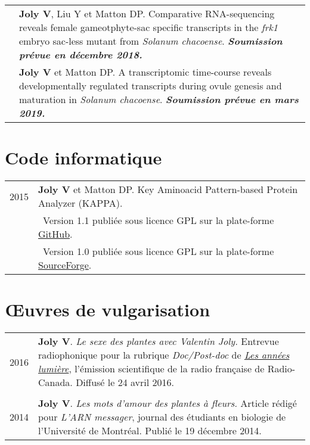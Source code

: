 \documentclass[letterpaper,12pt]{article}
\begin{document}
\begin{tabularx}{\textwidth}{@{}r|X@{}}
& \textbf{Joly V}, Liu Y et Matton DP.
  Comparative RNA-sequencing reveals female gameotphyte-sac specific transcripts in the \emph{frk1} embryo sac-less mutant from \emph{Solanum chacoense}. {\bfseries\em Soumission prévue en décembre 2018.} \vspace{3mm} \\

& \textbf{Joly V} et Matton DP.
  A transcriptomic time-course reveals developmentally regulated transcripts during ovule genesis and maturation in \emph{Solanum chacoense}. {\bfseries\em Soumission prévue en mars 2019.} \\
\end{tabularx}

\vspace{6mm}

\section[Code informatique]{Code informatique}

\begin{tabularx}{\textwidth}{@{}r|X@{}}

2015 & \textbf{Joly V} et Matton DP. Key Aminoacid Pattern-based Protein Analyzer (KAPPA). \\
& \small \hspace{1.5mm} \textbullet{}~Version 1.1 publiée sous licence GPL sur la plate-forme \href{https://github.com/valentinjoly/kappa-1.1}{GitHub}. \\
& \small \hspace{1.5mm} \textbullet{}~Version 1.0 publiée sous licence GPL sur la plate-forme \href{https://sourceforge.net/projects/kappa-sequence-search/}{SourceForge}. \\

\end{tabularx}

\vspace{6mm}

\section[Vulgarisation]{Œuvres de vulgarisation}

\begin{tabularx}{\textwidth}{@{}r|X@{}}

2016 & \textbf{Joly V}. {\em Le sexe des plantes avec Valentin Joly.} Entrevue radiophonique pour la rubrique {\em Doc/Post-doc} de \href{http://ici.radio-canada.ca/emissions/les_annees_lumiere/2015-2016/chronique.asp?idChronique=404672}{\em Les années lumière}, l’émission scientifique de la radio française de Radio-Canada. Diffusé le 24 avril 2016. \\

\multicolumn{2}{c}{} \\

2014 & \textbf{Joly V}. {\em Les mots d’amour des plantes à fleurs}. Article rédigé pour {\em L’ARN messager}, journal des étudiants en biologie de l’Université de Montréal. Publié le 19 décembre 2014. \\

\end{tabularx}
\end{document}
